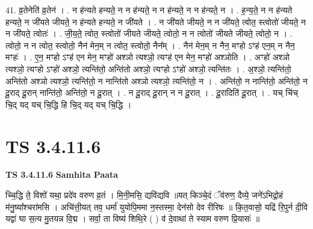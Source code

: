 \documentclass[17pt]{extarticle}
\begin{document}
41. व्र॒तेनेति॑ व्र॒तेन॑ । . न ह॑न्यते हन्यते॒ न न ह॑न्यते॒ न न ह॑न्यते॒ न न ह॑न्यते॒ न । . ह॒न्य॒ते॒ न न ह॑न्यते हन्यते॒ न जी॑यते जीयते॒ न ह॑न्यते हन्यते॒ न जी॑यते । . न जी॑यते जीयते॒ न न जी॑यते॒ त्वोत॒ स्त्वोतो॑ जीयते॒ न न जी॑यते॒ त्वोतः॑ । . जी॒य॒ते॒ त्वोत॒ स्त्वोतो॑ जीयते जीयते॒ त्वोतो॒ न न त्वोतो॑ जीयते जीयते॒ त्वोतो॒ न । . त्वोतो॒ न न त्वोत॒ स्त्वोतो॒ नैन॑ मेन॒म् न त्वोत॒ स्त्वोतो॒ नैन᳚म् । . नैन॑ मेन॒म् न नैन॒ मꣳहो ऽꣳह॑ एन॒म् न नैन॒ मꣳहः॑ । . ए॒न॒ मꣳहो ऽꣳह॑ एन मेन॒ मꣳहो॑ अश्ञो त्यश्ञो॒ त्यꣳह॑ एन मेन॒ मꣳहो॑ अश्ञोति । . अꣳहो॑ अश्ञो त्यश्ञो॒ त्यꣳहो ऽꣳहो॑ अश्ञो॒ त्यन्ति॑तो॒ अन्ति॑तो अश्ञो॒ त्यꣳहो ऽꣳहो॑ अश्ञो॒ त्यन्ति॑तः । . अ॒श्ञो॒ त्यन्ति॑तो॒ अन्ति॑तो अश्ञो त्यश्ञो॒ त्यन्ति॑तो॒ न नान्ति॑तो अश्ञो त्यश्ञो॒ त्यन्ति॑तो॒ न । . अन्ति॑तो॒ न नान्ति॑तो॒ अन्ति॑तो॒ न दू॒राद् दू॒रान् नान्ति॑तो॒ अन्ति॑तो॒ न दू॒रात् । . न दू॒राद् दू॒रान् न न दू॒रात् । . दू॒रादिति॑ दू॒रात् । . यच् चि॑च् चि॒द् यद् यच् चि॒द्धि हि चि॒द् यद् यच् चि॒द्धि । \newline
\pagebreak
{}

\section{ TS 3.4.11.6 }

\textbf{TS 3.4.11.6 } \newline
\textbf{Samhita Paata} \newline

च्चि॒द्धि ते॒ विशो॑ यथा॒ प्रदे॑व वरुण व्र॒तं । मि॒नी॒मसि॒ द्यवि॑द्यवि ॥यत् किञ्चे॒दं ॅव॑रुण॒ दैव्ये॒ जने॑ऽभिद्रो॒हं म॑नु॒ष्या᳚श्चरा॑मसि । अचि॑त्ती॒यत् तव॒ धर्मा॑ युयोपि॒ममा न॒स्तस्मा॒ देन॑सो देव रीरिषः ॥ कि॒त॒वासो॒ यद्रि॑ रि॒पुर्न दी॒वि यद्वा॑ घा स॒त्य मु॒तयन्न वि॒द्म । सर्वा॒ ता विष्य॑ शिथि॒रे ( ) व॑ दे॒वाथा॑ ते स्याम वरुण प्रि॒यासः॑ ॥ \newline
\end{document}
